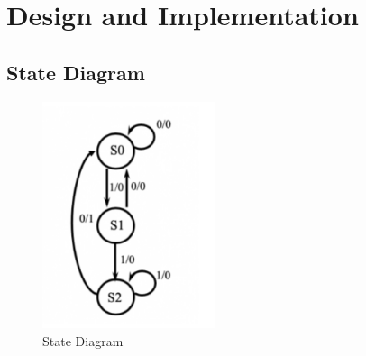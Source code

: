 \documentclass[11pt]{article}
\begin{document}
\section{Design and Implementation}

\subsection{State Diagram}
\begin{figure}[H]
	\includegraphics[width=0.45\textwidth]{state diagram.png}
	\caption{State Diagram}
	\label{fig:}
\end{figure}
\end{document}

